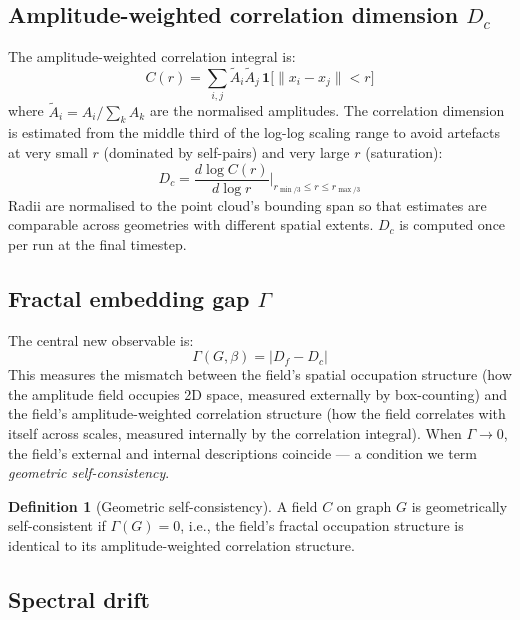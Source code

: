 \documentclass[12pt,a4paper]{article}
\theoremstyle{plain}
\theoremstyle{definition}
\newtheorem{definition}[theorem]{Definition}
\begin{document}
\subsection{Amplitude-weighted correlation dimension \texorpdfstring{$D_c$}{Dc}}

The amplitude-weighted correlation integral is:
\begin{equation}
C(r) = \sum_{i,j} \tilde{A}_i \tilde{A}_j\,
  \mathbf{1}\bigl[\|x_i - x_j\| < r\bigr]
\end{equation}
where $\tilde{A}_i = A_i / \sum_k A_k$ are the normalised amplitudes.
The correlation dimension is estimated from the middle third of the
log-log scaling range to avoid artefacts at very small $r$ (dominated
by self-pairs) and very large $r$ (saturation):
\begin{equation}
D_c = \frac{d\log C(r)}{d\log r}\bigg|_{r_{\min/3} \leq r \leq r_{\max/3}}
\end{equation}
Radii are normalised to the point cloud's bounding span so that
estimates are comparable across geometries with different spatial extents.
$D_c$ is computed once per run at the final timestep.

\subsection{Fractal embedding gap \texorpdfstring{$\Gamma$}{Gamma}}

The central new observable is:
\begin{equation}
\label{eq:gamma}
\Gamma(G,\beta) = |D_f - D_c|
\end{equation}
This measures the mismatch between the field's spatial occupation structure
(how the amplitude field occupies 2D space, measured externally by
box-counting) and the field's amplitude-weighted correlation
structure (how the field correlates with itself across scales, measured
internally by the correlation integral). When $\Gamma \to 0$, the
field's external and internal descriptions coincide --- a condition we
term \emph{geometric self-consistency}.

\begin{definition}[Geometric self-consistency]
A field $C$ on graph $G$ is geometrically self-consistent if
$\Gamma(G) = 0$, i.e., the field's fractal occupation structure is
identical to its amplitude-weighted correlation structure.
\end{definition}

\subsection{Spectral drift}
\end{document}
